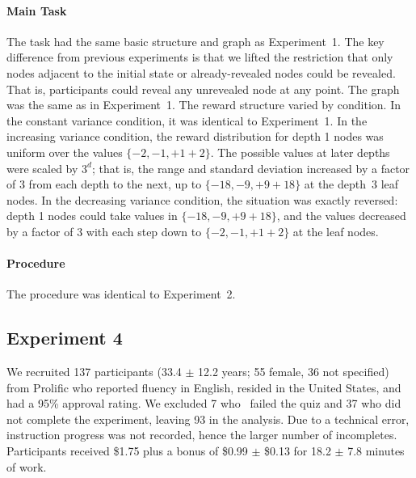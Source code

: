 \paragraph{Main Task}
The task had the same basic structure and graph as Experiment~1. The key difference from previous experiments is that we lifted the restriction that only nodes adjacent to the initial state or already-revealed nodes could be revealed. That is, participants could reveal any unrevealed node at any point. The graph was the same as in Experiment~1. The reward structure varied by condition. In the constant variance condition, it was identical to Experiment~1. In the increasing variance condition, the reward distribution for depth 1 nodes was uniform over the values $\{-2,-1, +1 +2\}$. The possible values at later depths were scaled by $3^d$; that is, the range and standard deviation increased by a factor of 3 from each depth to the next, up to $\{-18,-9, +9 +18\}$ at the depth~3 leaf nodes. In the decreasing variance condition, the situation was exactly reversed: depth 1 nodes could take values in $\{-18,-9, +9 +18\}$, and the values decreased by a factor of 3 with each step down to $\{-2,-1, +1 +2\}$ at the leaf nodes.

\paragraph{Procedure}
The procedure was identical to Experiment~2.


\subsection{Experiment 4} We recruited 137 participants (33.4 $\pm$ 12.2 years; \label{sec:planning-methods4}55 female, 36 not specified) from Prolific who reported fluency in English, resided in the United States, and had a 95\% approval rating. We excluded 7 who \ failed the quiz and 37 who did not complete the experiment, leaving 93 in the analysis. Due to a technical error, instruction progress was not recorded, hence the larger number of incompletes. Participants received \$1.75 plus a bonus of \$0.99 $\pm$ \$0.13 for 18.2 $\pm$ 7.8 minutes of work.

